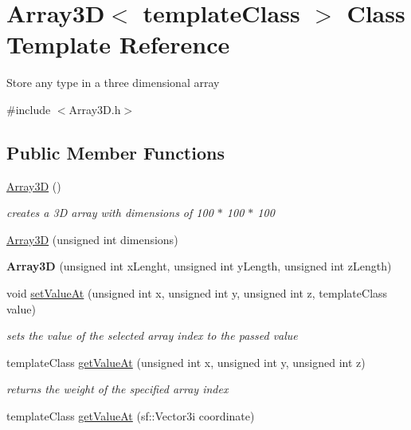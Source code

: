 \hypertarget{class_array3_d}{}\section{Array3D$<$ template\+Class $>$ Class Template Reference}
\label{class_array3_d}


Store any type in a three dimensional array 




{\ttfamily \#include $<$Array3\+D.\+h$>$}

\subsection*{Public Member Functions}
\begin{DoxyCompactItemize}
\item 
\hyperlink{class_array3_d_a86765d4b26c76555b35279d42a69158a}{Array3D} ()
\begin{DoxyCompactList}\small\item\em creates a 3D array with dimensions of 100 $\ast$ 100 $\ast$ 100 \end{DoxyCompactList}\item 
\hyperlink{class_array3_d_a16a7c8e4de7c1529f4d72c00d2f5b8f9}{Array3D} (unsigned int dimensions)
\item 
\mbox{\label{class_array3_d_a603b0ad73fd7bb2a28e08538bb8e2ad6}} 
{\bfseries Array3D} (unsigned int x\+Lenght, unsigned int y\+Length, unsigned int z\+Length)
\item 
void \hyperlink{class_array3_d_ab10ba3c75901c55b3d7cd2f58f6d6bde}{set\+Value\+At} (unsigned int x, unsigned int y, unsigned int z, template\+Class value)
\begin{DoxyCompactList}\small\item\em sets the value of the selected array index to the passed value\end{DoxyCompactList}\item 
template\+Class \hyperlink{class_array3_d_ac16b3ce3f37d597033a7b7fd1fdb5e41}{get\+Value\+At} (unsigned int x, unsigned int y, unsigned int z)
\begin{DoxyCompactList}\small\item\em returns the weight of the specified array index \end{DoxyCompactList}\item 
template\+Class \hyperlink{class_array3_d_ac1539b1f9907ae9996178b968e43c53c}{get\+Value\+At} (sf\+::\+Vector3i coordinate)

\end{DoxyCompactItemize}
